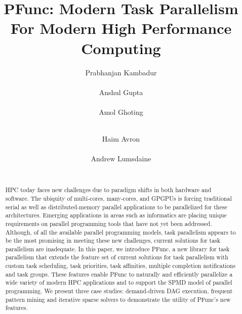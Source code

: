 \documentclass{sig-alternate}
\begin{document}
%

\title{PFunc: Modern Task Parallelism For Modern High Performance Computing}


\author{
\alignauthor Prabhanjan Kambadur\\ \\
\alignauthor Anshul Gupta\\ \\
\alignauthor Amol Ghoting\\ \\
 \and  %
\alignauthor Haim Avron\\ \\
\alignauthor Andrew Lumsdaine\\ \\
 }

\maketitle

\begin{abstract} 
HPC today faces new challenges due to paradigm shifts in both
hardware and software. The ubiquity of multi-cores, many-cores, and GPGPUs
is forcing traditional serial as well as distributed-memory parallel
applications to be parallelized for these architectures.  Emerging applications
in areas such as informatics are placing unique requirements on parallel
programming tools that have not yet been addressed.
%
Although, of all the available parallel programming models, task parallelism
appears to be the most promising in meeting these new challenges, current
solutions for task parallelism are inadequate.
%
In this paper, we introduce PFunc, a new library for task parallelism that
extends the feature set of current solutions for task parallelism with custom
task scheduling, task priorities, task affinities, multiple completion
notifications and task groups.
%
These features enable PFunc to naturally and efficiently parallelize a wide
variety of modern HPC applications and to support the SPMD model of parallel
programming.
%
We present three case studies: demand-driven DAG execution, frequent pattern
mining and iterative sparse solvers to demonstrate the utility of PFunc's new
features.  
\end{abstract}
\end{document}
